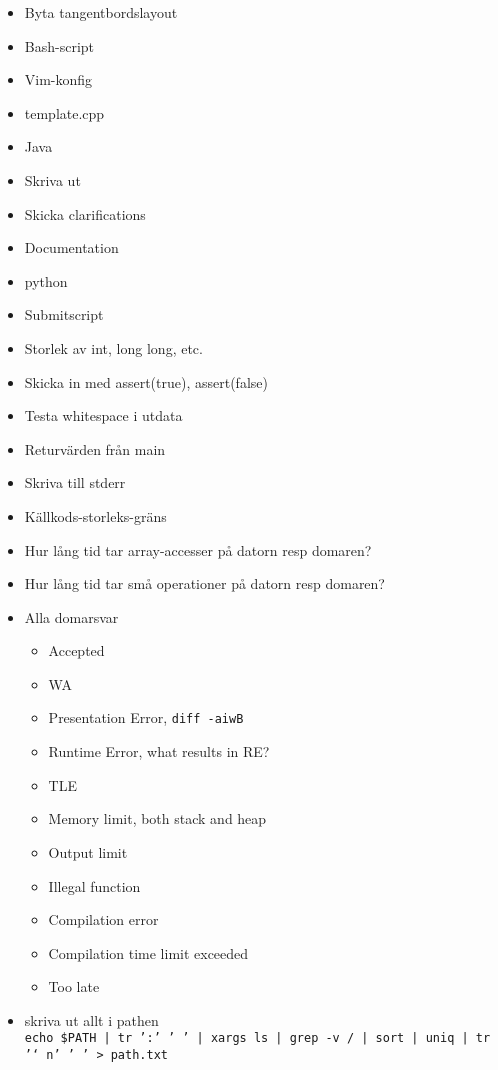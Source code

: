\begin{itemize}
	\item Byta tangentbordslayout
	\item Bash-script
	\item Vim-konfig
	\item template.cpp
	\item Java
	\item Skriva ut
	\item Skicka clarifications
	\item Documentation
	\item python
	\item Submitscript
	\item Storlek av int, long long, etc.
	\item Skicka in med assert(true), assert(false)
	\item Testa whitespace i utdata
	\item Returvärden från main
	\item Skriva till stderr
	\item Källkods-storleks-gräns
	\item Hur lång tid tar array-accesser på datorn resp domaren?
	\item Hur lång tid tar små operationer på datorn resp domaren?
	\item Alla domarsvar
		\begin{itemize}
			\item Accepted
			\item WA
			\item Presentation Error, \texttt{diff -aiwB}
			\item Runtime Error, what results in RE?
			\item TLE
			\item Memory limit, both stack and heap
			\item Output limit
			\item Illegal function
			\item Compilation error
			\item Compilation time limit exceeded
			\item Too late
		\end{itemize}
	\item skriva ut allt i pathen\\
		\texttt{echo \$PATH | tr ':' ' ' | xargs ls | grep -v / | sort | uniq | tr '\char`\\n' ' ' > path.txt}
\end{itemize}
